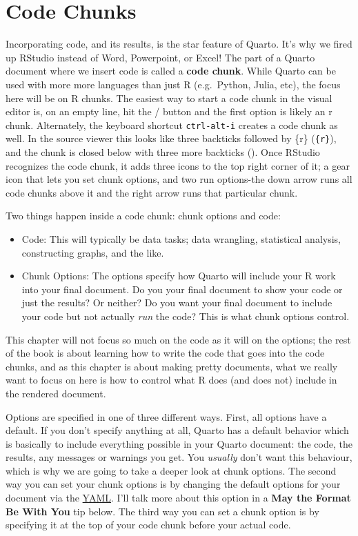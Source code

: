 \documentclass[
  letterpaper,
]{book}
\begin{document}
\section{Code Chunks}\label{code-chunks}

Incorporating code, and its results, is the star feature of Quarto. It's
why we fired up RStudio instead of Word, Powerpoint, or Excel! The part
of a Quarto document where we insert code is called a \textbf{code
chunk}. While Quarto can be used with more more languages than just R
(e.g.~Python, Julia, etc), the focus here will be on R chunks. The
easiest way to start a code chunk in the visual editor is, on an empty
line, hit the / button and the first option is likely an r chunk.
Alternately, the keyboard shortcut \texttt{ctrl-alt-i} creates a code
chunk as well. In the source viewer this looks like three backticks
followed by \{r\}
(\texttt{\textasciigrave{}\textasciigrave{}\textasciigrave{}\{r\}}), and
the chunk is closed below with three more backticks
(\texttt{\textasciigrave{}\textasciigrave{}\textasciigrave{}}). Once
RStudio recognizes the code chunk, it adds three icons to the top right
corner of it; a gear icon that lets you set chunk options, and two run
options-the down arrow runs all code chunks above it and the right arrow
runs that particular chunk.

Two things happen inside a code chunk: chunk options and code:

\begin{itemize}
\item
  Code: This will typically be data tasks; data wrangling, statistical
  analysis, constructing graphs, and the like.
\item
  Chunk Options: The options specify how Quarto will include your R work
  into your final document. Do you your final document to show your code
  or just the results? Or neither? Do you want your final document to
  include your code but not actually \emph{run} the code? This is what
  chunk options control.
\end{itemize}

This chapter will not focus so much on the code as it will on the
options; the rest of the book is about learning how to write the code
that goes into the code chunks, and as this chapter is about making
pretty documents, what we really want to focus on here is how to control
what R does (and does not) include in the rendered document.

Options are specified in one of three different ways. First, all options
have a default. If you don't specify anything at all, Quarto has a
default behavior which is basically to include everything possible in
your Quarto document: the code, the results, any messages or warnings
you get. You \emph{usually} don't want this behaviour, which is why we
are going to take a deeper look at chunk options. The second way you can
set your chunk options is by changing the default options for your
document via the \hyperref[yaml]{YAML}. I'll talk more about this option
in a \textbf{May the Format Be With You} tip below. The third way you
can set a chunk option is by specifying it at the top of your code chunk
before your actual code.
\end{document}
